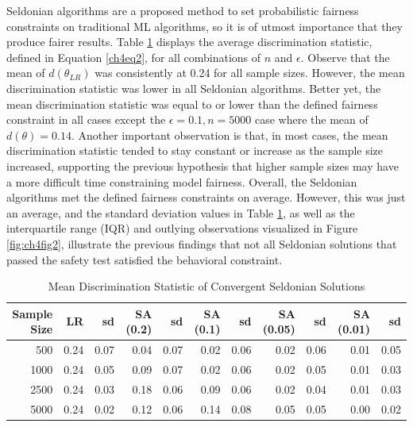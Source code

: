 \documentclass[12pt, twoside]{amherstthesis}
\begin{document}
Seldonian algorithms are a proposed method to set probabilistic fairness constraints on traditional ML algorithms, so it is of utmost importance that they produce fairer results. Table \ref{tab:ch4tab3} displays the average discrimination statistic, defined in Equation \ref{ch4eq2}, for all combinations of \(n\) and \(\epsilon\). Observe that the mean of \(d(\theta_{LR})\) was consistently at 0.24 for all sample sizes. However, the mean discrimination statistic was lower in all Seldonian algorithms. Better yet, the mean discrimination statistic was equal to or lower than the defined fairness constraint in all cases except the \(\epsilon = 0.1, n = 5000\) case where the mean of \(d(\theta) = 0.14\). Another important observation is that, in most cases, the mean discrimination statistic tended to stay constant or increase as the sample size increased, supporting the previous hypothesis that higher sample sizes may have a more difficult time constraining model fairness. Overall, the Seldonian algorithms met the defined fairness constraints on average. However, this was just an average, and the standard deviation values in Table \ref{tab:ch4tab3}, as well as the interquartile range (IQR) and outlying observations visualized in Figure \ref{fig:ch4fig2}, illustrate the previous findings that not all Seldonian solutions that passed the safety test satisfied the behavioral constraint.
\begin{table}

\caption{\label{tab:ch4tab3}Mean Discrimination Statistic of Convergent Seldonian Solutions}
\centering
\begin{tabular}[t]{rrrrrrrrrrr}
\toprule
Sample Size & LR & sd & SA (0.2) & sd  & SA (0.1) & sd   & SA (0.05) & sd    & SA (0.01) & sd     \\
\midrule
500 & 0.24 & 0.07 & 0.04 & 0.07 & 0.02 & 0.06 & 0.02 & 0.06 & 0.01 & 0.05\\
1000 & 0.24 & 0.05 & 0.09 & 0.07 & 0.02 & 0.06 & 0.02 & 0.05 & 0.01 & 0.03\\
2500 & 0.24 & 0.03 & 0.18 & 0.06 & 0.09 & 0.06 & 0.02 & 0.04 & 0.01 & 0.03\\
5000 & 0.24 & 0.02 & 0.12 & 0.06 & 0.14 & 0.08 & 0.05 & 0.05 & 0.00 & 0.02\\
\bottomrule
\end{tabular}
\end{table}
\end{document}

